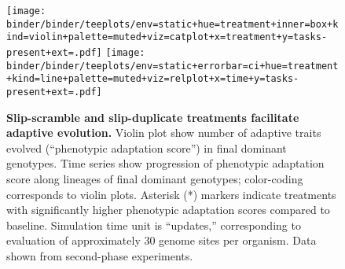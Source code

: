 \begin{figure}[!h]
  \texttt{[image: binder/binder/teeplots/env=static+hue=treatment+inner=box+kind=violin+palette=muted+viz=catplot+x=treatment+y=tasks-present+ext=.pdf]}%
   \texttt{[image: binder/binder/teeplots/env=static+errorbar=ci+hue=treatment+kind=line+palette=muted+viz=relplot+x=time+y=tasks-present+ext=.pdf]}

   \vspace{-2ex}

  \caption{\textbf{Slip-scramble and slip-duplicate treatments facilitate adaptive evolution.}
  \small Violin plot show number of adaptive traits evolved (``phenotypic adaptation score'') in final dominant genotypes.
  Time series show progression of phenotypic adaptation score along lineages of final dominant genotypes;
  color-coding corresponds to violin plots.
  Asterisk (*) markers indicate treatments with significantly higher phenotypic adaptation scores compared to baseline.
  Simulation time unit is ``updates,'' corresponding to evaluation of approximately 30 genome sites per organism.
  Data shown from second-phase experiments.
}
  \label{fig:results_panels}
\end{figure}
